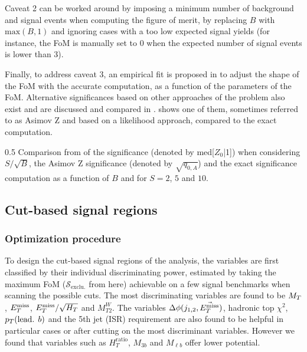     Caveat 2 can be worked around by imposing a minimum number of background and
    signal events when computing the figure of merit, by replacing $B$ with
    $\text{max}(B,1)$ and ignoring cases with a too low expected signal yields
    (for instance, the FoM is manually set to 0 when the expected number of
    signal events is lower than 3).

    Finally, to address caveat 3, an empirical fit is proposed in \cite{Punzi}
    to adjust the shape of the FoM with the accurate computation, as a function
    of the parameters of the FoM. Alternative significances based on other
    approaches of the problem also exist and are discussed and compared in
    \cite{FOMCousins, FOMLinnemann, FOMCowan}.   shows
    one of them, sometimes referred to as Asimov Z and based on a likelihood
    approach, compared to the exact computation.

                 {0.5}
                 {Comparison from \cite{FOMCowan} of the significance (denoted
                 by med[$Z_0$|1]) when considering $S/\sqrt{B}$, the Asimov Z
                 significance (denoted by $\sqrt{q_{0,A}}$) and the exact
                 significance computation as a function of $B$ and for $S = 2$,
                 $5$ and $10$.}

        \subsection{Cut-based signal regions}

            \subsubsection{Optimization procedure}

    To design the cut-based signal regions of the analysis, the variables are
    first classified by their individual discriminating power, estimated by
    taking the maximum FoM ($\mathcal{S}_\text{exclu.}$ from 
    here) achievable on a few signal benchmarks when scanning the possible cuts.
    The most discriminating variables are found to be $M_T$, $E_T^\text{miss}$,
    $E_T^\text{miss}/\sqrt{H_T}$ and $M_{T2}^{W}$. The variables $\Delta
    \phi(j_{1,2},\vec{E_T^\text{miss}})$, hadronic top $\chi^2$, $p_T(\text{lead. } b)$ and
    the 5th jet (ISR) requirement are also found to be helpful in particular
    cases or after cutting on the most discriminant variables. However we found
    that variables such as $H_T^\text{ratio}$, $M_{3b}$ and $M_{\ell b}$ offer
    lower potential.

